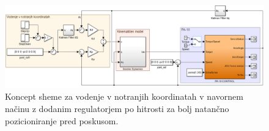 \begin{figure}
	\centering
	\includegraphics[trim={0 0cm 0 0cm},scale=0.25]{./Slike/notranje_koordinate_tq.png}
	\caption{Koncept \simulink sheme za vodenje v notranjih koordinatah v navornem na\v{c}inu z dodanim regulatorjem po hitrosti za bolj natan\v{c}no pozicioniranje pred poskusom.}
	\label{fig:notranje_koordinate_tq}
\end{figure}
